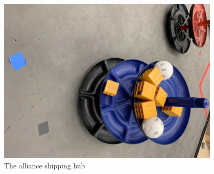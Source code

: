  
\begin{figure}[htp]
\centering
\includegraphics[width=0.95\textwidth, angle=0]{Meetings/December/12-08-21/12-8-21_Team_Figure1 - Nathan Forrer.JPG}
\caption{The alliance shipping hub}
\label{fig:120821_1}
\end{figure}



